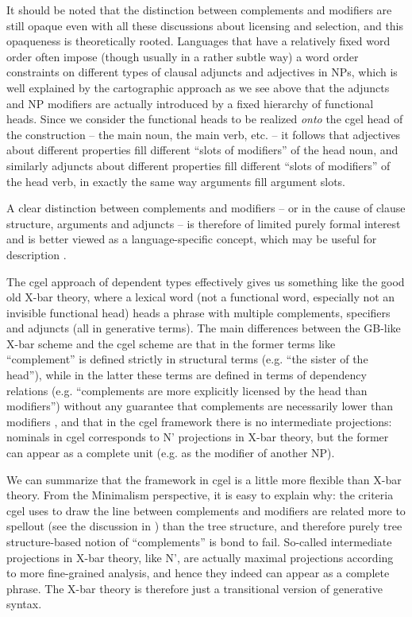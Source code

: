 \documentclass[../main.tex]{subfiles}
\begin{document}
It should be noted that the distinction between complements and modifiers are still opaque even with 
all these discussions about licensing and selection, and this opaqueness is theoretically rooted. 
Languages that have a relatively fixed word order often impose (though usually in a rather subtle way) 
a word order constraints on different types of clausal adjuncts and adjectives in NPs, 
which is well explained by the cartographic approach as we see above that the adjuncts and NP modifiers 
are actually introduced by a fixed hierarchy of functional heads. Since we consider the functional heads 
to be realized \emph{onto} the \ac{cgel} head of the construction -- the main noun, the main verb, etc. -- 
it follows that adjectives about different properties fill different ``slots of modifiers'' of the head noun, 
and similarly adjuncts about different properties fill different ``slots of modifiers'' of the head verb, 
in exactly the same way arguments fill argument slots. 

A clear distinction between complements and modifiers -- or in the cause of clause structure, arguments and
adjuncts -- is therefore of limited purely formal interest and is better viewed as a language-specific concept, 
which may be useful for description \citep{haspelmath2014arguments}. 

The \ac{cgel} approach of dependent types effectively gives us something like the good old X-bar theory, where a lexical word 
(not a functional word, especially not an invisible functional head) heads a phrase with multiple 
complements, specifiers and adjuncts (all in generative terms). The main differences between the GB-like 
X-bar scheme and the \ac{cgel} scheme are that in the former terms like ``complement'' is defined strictly 
in structural terms (e.g. ``the sister of the head''), while in the latter these terms are defined in 
terms of dependency relations (e.g. ``complements are more explicitly licensed by the head than 
modifiers'') without any guarantee that complements are necessarily lower than modifiers \citep{payne2007fusion},
and that in the \ac{cgel} framework there is no intermediate projections: nominals in \ac{cgel} corresponds 
to N' projections in X-bar theory, but the former can appear as a complete unit (e.g. as the modifier of another 
NP). 

We can summarize that the framework in \ac{cgel} is a little more flexible than X-bar theory. 
From the Minimalism perspective, it is easy to explain why: the criteria \ac{cgel} uses to draw the line 
between complements and modifiers are related more to spellout (see the discussion in )
than the tree structure, and therefore purely tree structure-based notion of ``complements'' is bond to fail. 
So-called intermediate projections in X-bar theory, like N', are actually maximal projections according to 
more fine-grained analysis, and hence they indeed can appear as a complete phrase.
The X-bar theory is therefore just a transitional version of generative syntax.
\end{document}
